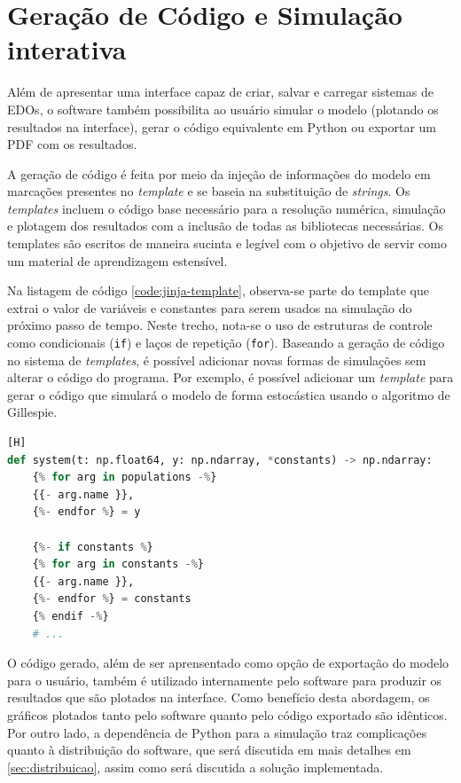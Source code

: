 \documentclass[
	12pt,				%
	openright,			%
	oneside,			%
	a4paper,			%
	main=brazil,
	english,			%
	]{ufsj-abntex2}
\begin{document}
\section{Geração de Código e Simulação interativa}

Além de apresentar uma interface capaz de criar, salvar e carregar sistemas de EDOs, o software também possibilita ao usuário simular o modelo (plotando os resultados na interface), gerar o código equivalente em Python ou exportar um PDF com os resultados.

A geração de código é feita por meio da injeção de informações do modelo em marcações presentes no \textit{template} e se baseia na substituição de \textit{strings}. Os \textit{templates} incluem o código base necessário para a resolução numérica, simulação e plotagem dos resultados com a inclusão de todas as bibliotecas necessárias. Os templates são escritos de maneira sucinta e legível com o objetivo de servir como um material de aprendizagem estensível.

Na listagem de código \ref{code:jinja-template}, observa-se parte do template que extrai o valor de variáveis e constantes para serem usados na simulação do próximo passo de tempo. Neste trecho, nota-se o uso de estruturas de controle como condicionais (\texttt{if}) e laços de repetição (\texttt{for}). Baseando a geração de código no sistema de \textit{templates}, é possível adicionar novas formas de simulações sem alterar o código do programa. Por exemplo, é possível adicionar um \textit{template} para gerar o código que simulará o modelo de forma estocástica usando o algoritmo de Gillespie.

\begin{lstlisting}[language=Python, label=code:jinja-template, caption=Trecho do \textit{template} responsável por extrair o valor de variáveis e constantes][H]
def system(t: np.float64, y: np.ndarray, *constants) -> np.ndarray:
    {% for arg in populations -%}
    {{- arg.name }},
    {%- endfor %} = y

    {%- if constants %}
    {% for arg in constants -%}
    {{- arg.name }},
    {%- endfor %} = constants
    {% endif -%}
    # ...
\end{lstlisting}

O código gerado, além de ser aprensentado como opção de exportação do modelo para o usuário, também é utilizado internamente pelo software para produzir os resultados que são plotados na interface. Como benefício desta abordagem, os gráficos plotados tanto pelo software quanto pelo código exportado são idênticos. Por outro lado, a dependência de Python para a simulação traz complicações quanto à distribuição do software, que será discutida em mais detalhes em \ref{sec:distribuicao}, assim como será discutida a solução implementada.
\end{document}
